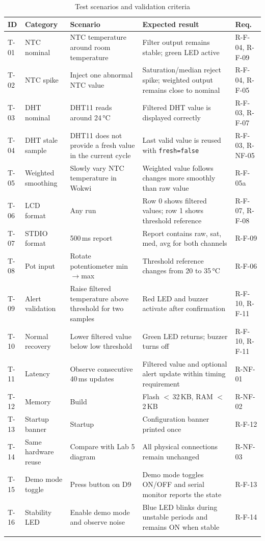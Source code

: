 \documentclass[12pt]{article}
\begin{document}
\begin{longtable}{p{0.9cm} p{2.3cm} p{4.8cm} p{4.3cm} p{0.9cm}}
\toprule
\textbf{ID} & \textbf{Category} & \textbf{Scenario} & \textbf{Expected result} & \textbf{Req.} \\
\midrule
\endfirsthead
T-01 & NTC nominal & NTC temperature around room temperature & Filter output remains stable; green LED active & R-F-04, R-F-09 \\
T-02 & NTC spike & Inject one abnormal NTC value & Saturation/median reject spike; weighted output remains close to nominal & R-F-04, R-F-05 \\
T-03 & DHT nominal & DHT11 reads around 24\,°C & Filtered DHT value is displayed correctly & R-F-03, R-F-07 \\
T-04 & DHT stale sample & DHT11 does not provide a fresh value in the current cycle & Last valid value is reused with \texttt{fresh=false} & R-F-03, R-NF-05 \\
T-05 & Weighted smoothing & Slowly vary NTC temperature in Wokwi & Weighted value follows changes more smoothly than raw value & R-F-05a \\
T-06 & LCD format & Any run & Row 0 shows filtered values; row 1 shows threshold reference & R-F-07, R-F-08 \\
T-07 & STDIO format & 500\,ms report & Report contains raw, sat, med, avg for both channels & R-F-09 \\
T-08 & Pot input & Rotate potentiometer min$\rightarrow$max & Threshold reference changes from 20 to 35\,°C & R-F-06 \\
T-09 & Alert validation & Raise filtered temperature above threshold for two samples & Red LED and buzzer activate after confirmation & R-F-10, R-F-11 \\
T-10 & Normal recovery & Lower filtered value below low threshold & Green LED returns; buzzer turns off & R-F-10, R-F-11 \\
T-11 & Latency & Observe consecutive 40\,ms updates & Filtered value and optional alert update within timing requirement & R-NF-01 \\
T-12 & Memory & Build & Flash $<$\,32\,KB, RAM $<$\,2\,KB & R-NF-02 \\
T-13 & Startup banner & Startup & Configuration banner printed once & R-F-12 \\
T-14 & Same hardware reuse & Compare with Lab 5 diagram & All physical connections remain unchanged & R-NF-03 \\
T-15 & Demo mode toggle & Press button on D9 & Demo mode toggles ON/OFF and serial monitor reports the state & R-F-13 \\
T-16 & Stability LED & Enable demo mode and observe noise & Blue LED blinks during unstable periods and remains ON when stable & R-F-14 \\
\bottomrule
\caption{Test scenarios and validation criteria}
\label{tab:tests}
\end{longtable}
\end{document}
